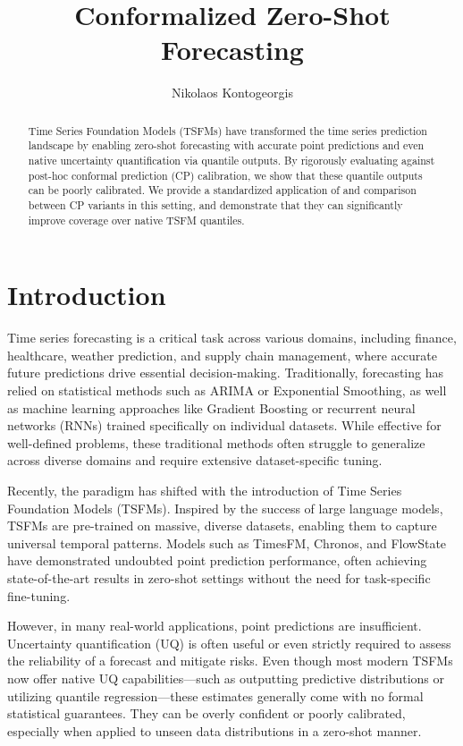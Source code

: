 \documentclass[12pt, a4paper]{article}
\title{
	Conformalized
	Zero-Shot Forecasting
}
\author{Nikolaos Kontogeorgis}
\date{}
\begin{document}
\maketitle

\begin{abstract}
	Time Series Foundation Models (TSFMs) have transformed the time series prediction landscape by enabling zero-shot forecasting with accurate point predictions and even native uncertainty quantification via quantile outputs. By rigorously evaluating against post-hoc conformal prediction (CP) calibration, we show that these quantile outputs can be poorly calibrated. We provide a standardized application of and comparison between CP variants in this setting, and demonstrate that they can significantly improve coverage over native TSFM quantiles.
\end{abstract}

\section{Introduction}
Time series forecasting is a critical task across various domains, including finance, healthcare, weather prediction, and supply chain management, where accurate future predictions drive essential decision-making. Traditionally, forecasting has relied on statistical methods such as ARIMA or Exponential Smoothing, as well as machine learning approaches like Gradient Boosting or recurrent neural networks (RNNs) trained specifically on individual datasets. While effective for well-defined problems, these traditional methods often struggle to generalize across diverse domains and require extensive dataset-specific tuning.

Recently, the paradigm has shifted with the introduction of Time Series Foundation Models (TSFMs). Inspired by the success of large language models, TSFMs are pre-trained on massive, diverse datasets, enabling them to capture universal temporal patterns. Models such as TimesFM, Chronos, and FlowState have demonstrated undoubted point prediction performance, often achieving state-of-the-art results in zero-shot settings without the need for task-specific fine-tuning.

However, in many real-world applications, point predictions are insufficient. Uncertainty quantification (UQ) is often useful or even strictly required to assess the reliability of a forecast and mitigate risks. Even though most modern TSFMs now offer native UQ capabilities---such as outputting predictive distributions or utilizing quantile regression---these estimates generally come with no formal statistical guarantees. They can be overly confident or poorly calibrated, especially when applied to unseen data distributions in a zero-shot manner.
\end{document}
